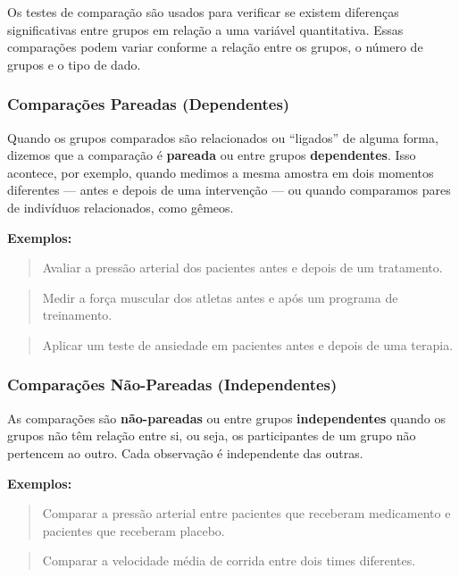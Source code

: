 \documentclass[
]{book}
\begin{document}
Os testes de comparação são usados para verificar se existem diferenças significativas entre grupos em relação a uma variável quantitativa. Essas comparações podem variar conforme a relação entre os grupos, o número de grupos e o tipo de dado.

\subsubsection{Comparações Pareadas (Dependentes)}\label{comparauxe7uxf5es-pareadas-dependentes}

Quando os grupos comparados são relacionados ou ``ligados'' de alguma forma, dizemos que a comparação é \textbf{pareada} ou entre grupos \textbf{dependentes}. Isso acontece, por exemplo, quando medimos a mesma amostra em dois momentos diferentes --- antes e depois de uma intervenção --- ou quando comparamos pares de indivíduos relacionados, como gêmeos.

\textbf{Exemplos:}

\begin{quote}
Avaliar a pressão arterial dos pacientes antes e depois de um tratamento.
\end{quote}

\begin{quote}
Medir a força muscular dos atletas antes e após um programa de treinamento.
\end{quote}

\begin{quote}
Aplicar um teste de ansiedade em pacientes antes e depois de uma terapia.
\end{quote}

\subsubsection{Comparações Não-Pareadas (Independentes)}\label{comparauxe7uxf5es-nuxe3o-pareadas-independentes}

As comparações são \textbf{não-pareadas} ou entre grupos \textbf{independentes} quando os grupos não têm relação entre si, ou seja, os participantes de um grupo não pertencem ao outro. Cada observação é independente das outras.

\textbf{Exemplos:}

\begin{quote}
Comparar a pressão arterial entre pacientes que receberam medicamento e pacientes que receberam placebo.
\end{quote}

\begin{quote}
Comparar a velocidade média de corrida entre dois times diferentes.
\end{quote}
\end{document}
